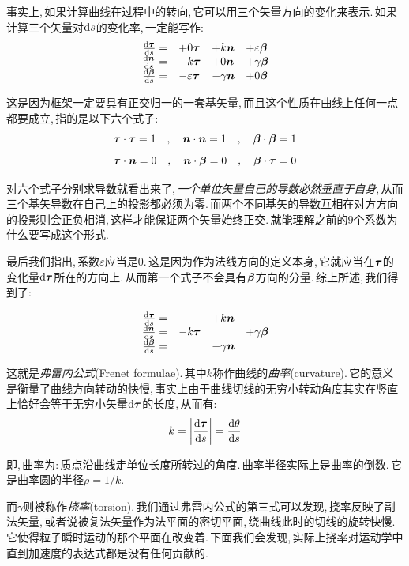 事实上,\,如果计算曲线在过程中的转向,\,它可以用三个矢量方向的变化来表示.\,如果计算三个矢量对$\textrm{d} s$的变化率,\,一定能写作:
\[\begin{array}{rlll}
\frac{\textrm{d} \boldsymbol{\tau}}{\textrm{d} s}=		&	+0\boldsymbol{\tau} 	&	+k\boldsymbol{n} 		& +\varepsilon\boldsymbol{\beta}\\
\frac{\textrm{d} \boldsymbol{n}}{\textrm{d} s}=		&	-k\boldsymbol{\tau} 	&	+0\boldsymbol{n} 		& +\gamma\boldsymbol{\beta}\\
\frac{\textrm{d} \boldsymbol{\beta}}{\textrm{d} s}=		&	-\varepsilon\boldsymbol{\tau} 	&	-\gamma\boldsymbol{n} 		& +0\boldsymbol{\beta}
\end{array}\]

这是因为框架一定要具有正交归一的一套基矢量,\,而且这个性质在曲线上任何一点都要成立,\,指的是以下六个式子:
\[\boldsymbol{\tau}\cdot\boldsymbol{\tau}=1\quad,\quad\boldsymbol{n}\cdot\boldsymbol{n}=1\quad,\quad \boldsymbol{\beta}\cdot\boldsymbol{\beta}=1\]
\[\boldsymbol{\tau}\cdot\boldsymbol{n}=0\quad,\quad\boldsymbol{n}\cdot\boldsymbol{\beta}=0\quad,\quad \boldsymbol{\beta}\cdot\boldsymbol{\tau}=0\]

对六个式子分别求导数就看出来了,\,\emph{一个单位矢量自己的导数必然垂直于自身},\,从而三个基矢导数在自己上的投影都必须为零.\,而两个不同基矢的导数互相在对方方向的投影则会正负相消,\,这样才能保证两个矢量始终正交.\,就能理解之前的$9$个系数为什么要写成这个形式.

最后我们指出,\,系数$\varepsilon$应当是$0$.\,这是因为作为法线方向的定义本身,\,它就应当在$\boldsymbol{\tau}$的变化量$\textrm{d}\boldsymbol{\tau}$所在的方向上.\,从而第一个式子不会具有$\boldsymbol{\beta}$方向的分量.\,综上所述,\,我们得到了:

\[\begin{array}{rlll}
\frac{\textrm{d} \boldsymbol{\tau}}{\textrm{d} s}=		&	 	&	+k\boldsymbol{n} 		& \\
\frac{\textrm{d} \boldsymbol{n}}{\textrm{d} s}=		&	-k\boldsymbol{\tau} 	&	 		& +\gamma\boldsymbol{\beta}\\
\frac{\textrm{d} \boldsymbol{\beta}}{\textrm{d} s}=		&	 	&	-\gamma\boldsymbol{n} 		& 
\end{array}\]

这就是\emph{弗雷内公式}(Frenet formulae).\,其中$k$称作曲线的\emph{曲率}(curvature).\,它的意义是衡量了曲线方向转动的快慢,\,事实上由于曲线切线的无穷小转动角度其实在竖直上恰好会等于无穷小矢量$\textrm{d}\boldsymbol{\tau}$的长度,\,从而有:
\[k=\left| \frac{\textrm{d}\boldsymbol{\tau}}{\textrm{d} s} \right|=\frac{\textrm{d}\theta}{\textrm{d} s}\]

即,\,曲率为:\,质点沿曲线走单位长度所转过的角度.\,曲率半径实际上是曲率的倒数.\,它是曲率圆的半径$\rho=1/k$.

而$\gamma$则被称作\emph{挠率}(torsion).\,我们通过弗雷内公式的第三式可以发现,\,挠率反映了副法矢量,\,或者说被复法矢量作为法平面的密切平面,\,绕曲线此时的切线的旋转快慢.\,它使得粒子瞬时运动的那个平面在改变着.\,下面我们会发现,\,实际上挠率对运动学中直到加速度的表达式都是没有任何贡献的.

